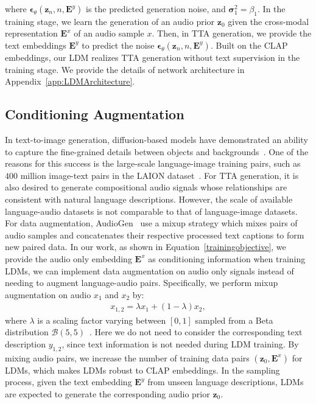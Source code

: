 where $\boldsymbol{\epsilon}_{\theta}(\boldsymbol{z}_{n},n,\boldsymbol{E}^{y})$ is the predicted generation noise, and $\boldsymbol{\sigma}_{1}^{2}=\beta_{1}$. In the training stage, we learn the generation of an audio prior $\boldsymbol{z}_{0}$ given the cross-modal representation $\boldsymbol{E}^{x}$ of an audio sample $x$. Then, in TTA generation, we provide the text embeddings $\boldsymbol{E}^{y}$ to predict the noise $\boldsymbol{\epsilon}_{\theta}(\boldsymbol{z}_{n},n,\boldsymbol{E}^{y})$. Built on the CLAP embeddings, our LDM realizes TTA generation without text supervision in the training stage. We provide the details of network architecture in Appendix~\ref{app:LDMArchitecture}.

\subsection{Conditioning Augmentation}
\label{CA}

In text-to-image generation, diffusion-based models have demonstrated an ability to capture the fine-grained details between objects and backgrounds~\cite{DALLE2,Imagen,CompositionalDDPM}. One of the reasons for this success is the large-scale language-image training pairs, such as $400$ million image-text pairs in the LAION dataset~\cite{schuhmann2021laion}. For TTA generation, it is also desired to generate compositional audio signals whose relationships are consistent with natural language descriptions. However, the scale of available language-audio datasets is not comparable to that of language-image datasets. For data augmentation, AudioGen~\cite{kreuk2022audiogen} use a mixup strategy which mixes pairs of audio samples and concatenates their respective processed text captions to form new paired data. In our work, as shown in Equation~\ref{trainingobjective}, we provide the audio only embedding $\boldsymbol{E}^{x}$ as conditioning information when training LDMs, we can implement data augmentation on audio only signals instead of needing to augment language-audio pairs. Specifically, we perform mixup augmentation on audio $x_{1}$ and $x_{2}$ by:  
\begin{align}
\label{mixup}
x_{1,2}=\lambda x_{1}+(1-\lambda)x_{2},
\end{align}
where $\lambda$ is a scaling factor varying between $\left[0, 1\right]$ sampled from a Beta distribution $\mathcal B(5,5)$~\cite{gong2021psla}. Here we do not need to consider the corresponding text description $y_{1,2}$, since text information is not needed during LDM training. By mixing audio pairs, we increase the number of training data pairs $(\boldsymbol{z}_{0}, \boldsymbol{E}^{x})$ for LDMs, which makes LDMs robust to CLAP embeddings. In the sampling process, given the text embedding $\boldsymbol{E}^{y}$ from unseen language descriptions, LDMs are expected to generate the corresponding audio prior $\boldsymbol{z}_{0}$.


